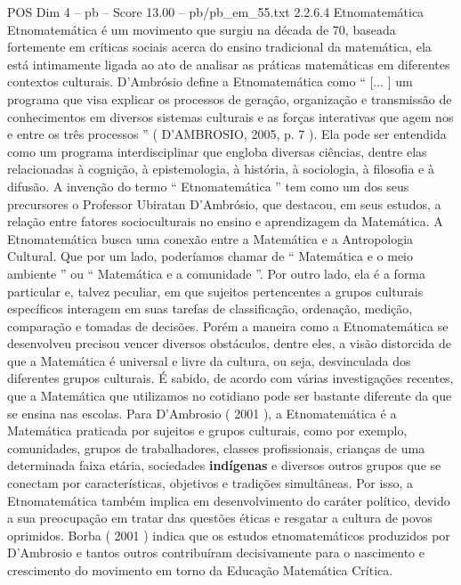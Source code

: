\begin{textsample}{POS Dim 4 – pb – Score 13.00 – pb/pb\_em\_55.txt}  \label{ex:f4_pos_262}
2.2.6.4 Etnomatemática Etnomatemática é um movimento que surgiu na década de 70, baseada fortemente em críticas sociais acerca do ensino tradicional da matemática, ela está intimamente ligada ao ato de analisar as práticas matemáticas em diferentes contextos culturais.
D’Ambrósio define a Etnomatemática como “ [... ] um programa que visa explicar os processos de geração, organização e transmissão de conhecimentos em diversos sistemas culturais e as forças interativas que agem nos e entre os três processos ” ( D’AMBROSIO, 2005, p. 7 ).
Ela pode ser entendida como um programa interdisciplinar que engloba diversas ciências, dentre elas relacionadas à cognição, à epistemologia, à história, à sociologia, à filosofia e à difusão.
A invenção do termo “ Etnomatemática ” tem como um dos seus precursores o Professor Ubiratan D’Ambrósio, que destacou, em seus estudos, a relação entre fatores socioculturais no ensino e aprendizagem da Matemática.
A Etnomatemática busca uma conexão entre a Matemática e a Antropologia Cultural.
Que por um lado, poderíamos chamar de “ Matemática e o meio ambiente ” ou “ Matemática e a comunidade ”.
Por outro lado, ela é a forma particular e, talvez peculiar, em que sujeitos pertencentes a grupos culturais específicos interagem em suas tarefas de classificação, ordenação, medição, comparação e tomadas de decisões.
Porém a maneira como a Etnomatemática se desenvolveu precisou vencer diversos obstáculos, dentre eles, a visão distorcida de que a Matemática é universal e livre da cultura, ou seja, desvinculada dos diferentes grupos culturais.
É sabido, de acordo com várias investigações recentes, que a Matemática que utilizamos no cotidiano pode ser bastante diferente da que se ensina nas escolas.
Para D’Ambrosio ( 2001 ), a Etnomatemática é a Matemática praticada por sujeitos e grupos culturais, como por exemplo, comunidades, grupos de trabalhadores, classes profissionais, crianças de uma determinada faixa etária, sociedades \textbf{indígenas} e diversos outros grupos que se conectam por características, objetivos e tradições simultâneas.
Por isso, a Etnomatemática também implica em desenvolvimento do caráter político, devido a sua preocupação em tratar das questões éticas e resgatar a cultura de povos oprimidos.
Borba ( 2001 ) indica que os estudos etnomatemáticos produzidos por D’Ambrosio e tantos outros contribuíram decisivamente para o nascimento e crescimento do movimento em torno da Educação Matemática Crítica.

\end{textsample}

